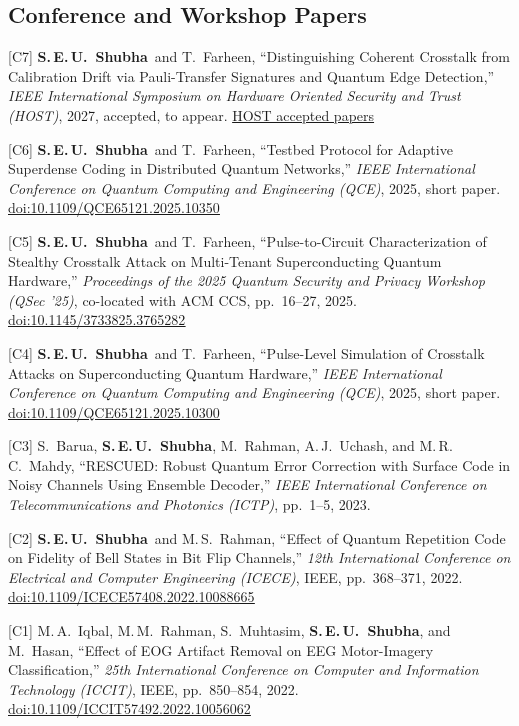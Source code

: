 \documentclass[letterpaper,11pt]{article}
\newcommand{\me}{\textbf{S.\,E.\,U.~Shubha}}
\newcommand{\cvlink}[2]{\href{#1}{\underline{#2}}}
\begin{document}
\subsection{Conference and Workshop Papers}
\begin{pubs}[label={[C\arabic*]}]
  \item[{[C7]}] \me\ and T.~Farheen, ``Distinguishing Coherent Crosstalk from Calibration Drift via Pauli-Transfer Signatures and Quantum Edge Detection,'' \textit{IEEE International Symposium on Hardware Oriented Security and Trust (HOST)}, 2027, accepted, to appear. \cvlink{https://host.conferences.computer.org/2027/accepted-papers/}{HOST accepted papers}
  \item[{[C6]}] \me\ and T.~Farheen, ``Testbed Protocol for Adaptive Superdense Coding in Distributed Quantum Networks,'' \textit{IEEE International Conference on Quantum Computing and Engineering (QCE)}, 2025, short paper. \cvlink{https://doi.org/10.1109/QCE65121.2025.10350}{doi:10.1109/QCE65121.2025.10350}
  \item[{[C5]}] \me\ and T.~Farheen, ``Pulse-to-Circuit Characterization of Stealthy Crosstalk Attack on Multi-Tenant Superconducting Quantum Hardware,'' \textit{Proceedings of the 2025 Quantum Security and Privacy Workshop (QSec '25)}, co-located with ACM CCS, pp.~16--27, 2025. \cvlink{https://doi.org/10.1145/3733825.3765282}{doi:10.1145/3733825.3765282}
  \item[{[C4]}] \me\ and T.~Farheen, ``Pulse-Level Simulation of Crosstalk Attacks on Superconducting Quantum Hardware,'' \textit{IEEE International Conference on Quantum Computing and Engineering (QCE)}, 2025, short paper. \cvlink{https://doi.org/10.1109/QCE65121.2025.10300}{doi:10.1109/QCE65121.2025.10300}
  \item[{[C3]}] S.~Barua, \me, M.~Rahman, A.\,J.~Uchash, and M.\,R.\,C.~Mahdy, ``RESCUED: Robust Quantum Error Correction with Surface Code in Noisy Channels Using Ensemble Decoder,'' \textit{IEEE International Conference on Telecommunications and Photonics (ICTP)}, pp.~1--5, 2023.
  \item[{[C2]}] \me\ and M.\,S.~Rahman, ``Effect of Quantum Repetition Code on Fidelity of Bell States in Bit Flip Channels,'' \textit{12th International Conference on Electrical and Computer Engineering (ICECE)}, IEEE, pp.~368--371, 2022. \cvlink{https://doi.org/10.1109/ICECE57408.2022.10088665}{doi:10.1109/ICECE57408.2022.10088665}
  \item[{[C1]}] M.\,A.~Iqbal, M.\,M.~Rahman, S.~Muhtasim, \me, and M.~Hasan, ``Effect of EOG Artifact Removal on EEG Motor-Imagery Classification,'' \textit{25th International Conference on Computer and Information Technology (ICCIT)}, IEEE, pp.~850--854, 2022. \cvlink{https://doi.org/10.1109/ICCIT57492.2022.10056062}{doi:10.1109/ICCIT57492.2022.10056062}
\end{pubs}
\end{document}
